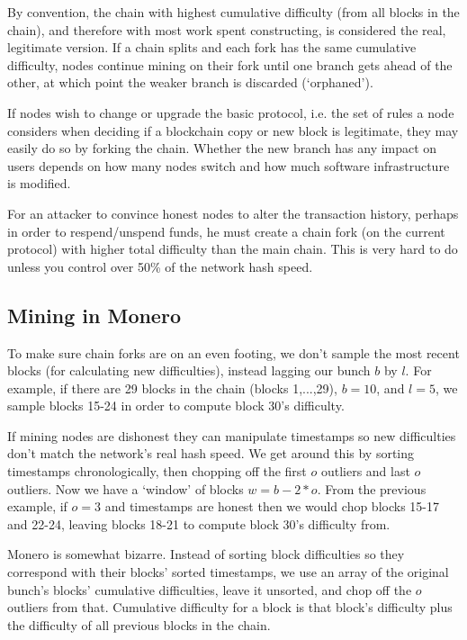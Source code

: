 By convention, the chain with highest cumulative difficulty (from all blocks in the chain), and therefore with most work spent constructing, is considered the real, legitimate version. If a chain splits and each fork has the same cumulative difficulty, nodes continue mining on their fork until one branch gets ahead of the other, at which point the weaker branch is discarded (`orphaned').%

If nodes wish to change or upgrade the basic protocol, i.e. the set of rules a node considers when deciding if a blockchain copy or new block is legitimate, they may easily do so by forking the chain. Whether the new branch has any impact on users depends on how many nodes switch and how much software infrastructure is modified.

For an attacker to convince honest nodes to alter the transaction history, perhaps in order to respend/unspend funds, he must create a chain fork (on the current protocol) with higher total difficulty than the main chain. This is very hard to do unless you control over 50\% of the network hash speed. \cite{Nakamoto_bitcoin}


\subsection{Mining in Monero} %

To make sure chain forks are on an even footing, we don't sample the most recent blocks (for calculating new difficulties), instead lagging our bunch $b$ by $l$. For example, if there are 29 blocks in the chain (blocks 1,...,29), $b = 10$, and $l = 5$, we sample blocks 15-24 in order to compute block 30's difficulty.

If mining nodes are dishonest they can manipulate timestamps so new difficulties don't match the network's real hash speed. We get around this by sorting timestamps chronologically, then chopping off the first $o$ outliers and last $o$ outliers. Now we have a `window' of blocks $w = b-2*o$. From the previous example, if $o = 3$ and timestamps are honest then we would chop blocks 15-17 and 22-24, leaving blocks 18-21 to compute block 30's difficulty from.

Monero is somewhat bizarre. Instead of sorting block difficulties so they correspond with their blocks' sorted timestamps, we use an array of the original bunch's blocks' cumulative difficulties, leave it unsorted, and chop off the $o$ outliers from that. Cumulative difficulty for a block is that block's difficulty plus the difficulty of all previous blocks in the chain.

